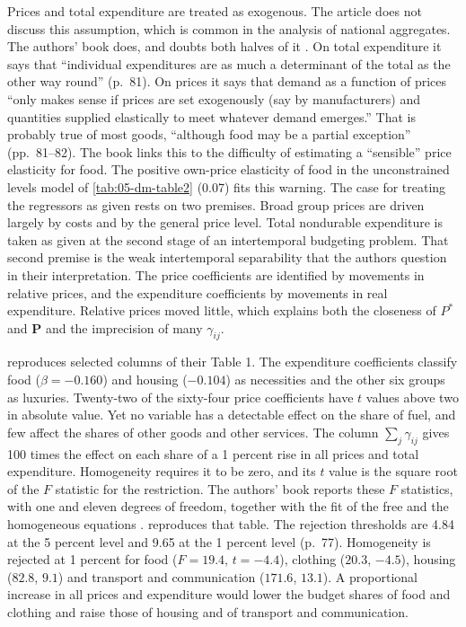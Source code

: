 Prices and total expenditure are treated as exogenous. The article does not discuss this assumption,
which is common in the analysis of national aggregates. The authors' book does, and doubts both halves
of it \citep[\S 3.5, pp.~81--82]{DeatonMuellbauer1980b}. On total expenditure it says that ``individual
expenditures are as much a determinant of the total as the other way round'' (p.~81). On prices it says
that demand as a function of prices ``only makes sense if prices are set exogenously (say by
manufacturers) and quantities supplied elastically to meet whatever demand emerges.'' That is probably
true of most goods, ``although food may be a partial exception'' (pp.~81--82). The book links this to
the difficulty of estimating a ``sensible'' price elasticity for food. The positive own-price elasticity of
food in the unconstrained levels model of \cref{tab:05-dm-table2} (0.07) fits this warning. The case for
treating the regressors as given rests on two premises. Broad group prices are driven largely by costs and
by the general price level. Total nondurable expenditure is taken as given at the second stage of an
intertemporal budgeting problem. That second premise is the weak intertemporal separability that the
authors question in their interpretation. The price coefficients are identified by movements in
relative prices, and the expenditure coefficients by movements in real expenditure. Relative prices moved
little, which explains both the closeness of $P^*$ and $\mathbf{P}$ and the imprecision of many
$\gamma_{ij}$.

 reproduces selected columns of their Table 1. The expenditure coefficients
classify food ($\beta = -0.160$) and housing ($-0.104$) as necessities and the other six groups as
luxuries. Twenty-two of the sixty-four price coefficients have $t$ values above two in absolute value.
Yet no variable has a detectable effect on the share of fuel, and few affect the shares of other goods
and other services. The column $\sum_j\gamma_{ij}$ gives 100 times the effect on each share of a 1
percent rise in all prices and total expenditure. Homogeneity requires it to be zero, and its $t$ value
is the square root of the $F$ statistic for the restriction. The authors' book reports these $F$
statistics, with one and eleven degrees of freedom, together with the fit of the free and the
homogeneous equations \citep[\S 3.4, Table~3.4, pp.~77--78]{DeatonMuellbauer1980b}.
 reproduces that table. The rejection thresholds are 4.84 at the 5 percent level and
9.65 at the 1 percent level (p.~77). Homogeneity is rejected at 1 percent for food ($F = 19.4$, $t =
-4.4$), clothing ($20.3$, $-4.5$), housing ($82.8$, $9.1$) and transport and communication ($171.6$,
$13.1$). A proportional increase in all prices and expenditure would lower the budget shares of food and
clothing and raise those of housing and of transport and communication.

